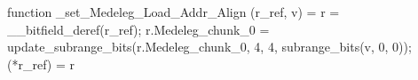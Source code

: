 function _set_Medeleg_Load_Addr_Align (r_ref, v) = {
    r = __bitfield_deref(r_ref);
    r.Medeleg_chunk_0 = update_subrange_bits(r.Medeleg_chunk_0, 4, 4, subrange_bits(v, 0, 0));
    (*r_ref) = r
}
